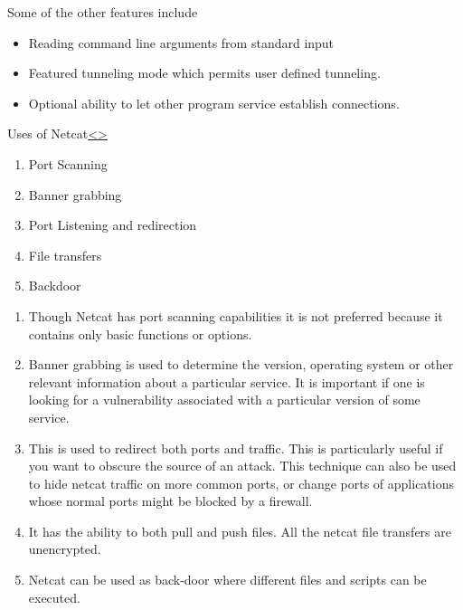 \documentclass[12pt]{extarticle}
\newenvironment{instructionblock}{\Large\bgroup}{\egroup}
\begin{document}
Some of the other features include 
\begin{itemize}
\item Reading command line arguments from standard input
\item Featured tunneling mode which permits user defined tunneling.
\item Optional ability to let other program service establish connections.\cite{Inetcat} 

\end{itemize}

\pagebreak
\begin{slide}{Uses of Netcat}{\hyperref[slide 15]{\textless}\hyperref[slide 17]{\textgreater}}
\vskip 5pt
\begin{instructionblock}
\begin{enumerate}
\item Port Scanning
\item Banner grabbing
\item Port Listening and redirection
\item File transfers
\item Backdoor
\end{enumerate}
\end{instructionblock}
\end{slide}
\begin{enumerate}
	\item Though Netcat has port scanning capabilities it is not preferred because it contains only basic functions or options.
	\item Banner grabbing is used to determine the version, operating system or other relevant information about a particular service. It is important if one is looking for a vulnerability associated with a particular version of some service.
	\item This is used to redirect both ports and traffic. This is particularly useful if you want to obscure the source of an attack. This technique can also be used to hide netcat traffic on more common ports, or change ports of applications whose normal ports might be blocked by a firewall.
	\item It has the ability to both pull and push files. All the netcat file transfers are unencrypted.
	\item Netcat can be used as back-door where different files and scripts can be executed.\cite{CEH} 
\end{enumerate}
\end{document}

